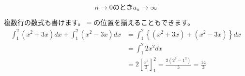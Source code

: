 \documentclass[paper=a4paper,fontsize=10pt]{jlreq}
\begin{document}
\begin{equation}
  n\longrightarrow 0 のときa_n\longrightarrow \infty
\end{equation}

複数行の数式も書けます。$=$の位置を揃えることもできます。\\

\begin{align}
  \int_{1}^{2}\left(x^2 + 3x\right)dx + \int_{1}^{2}\left(x^2 - 3x\right)dx &= \int_{1}^{2}\left\{\left(x^2 + 3x\right) + \left(x^2 - 3x\right)\right\}dx \\
  &= \int_{1}^{2}2x^2dx \\
  &= 2\left[\frac{x^3}{3}\right]^2_1 = \frac{2\left(2^3 - 1^3\right)}{3} = \frac{14}{3}
\end{align}
\end{document}
